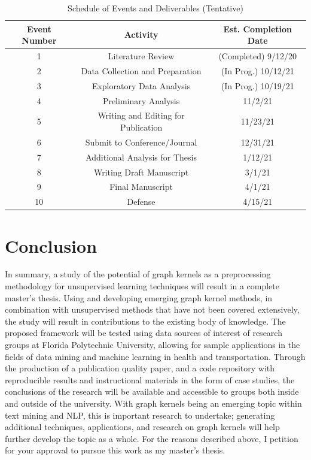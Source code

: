 \documentclass[11pt]{report}
\begin{document}
\begin{table}[ht]
\caption{Schedule of Events and Deliverables (Tentative)}
\label{tab:schedule}
\centering
\begin{tabular}{ c c c}
\hline
\hline
Event Number & Activity & Est. Completion Date \\ [0.5ex]
\hline
1 & Literature Review & (Completed) 9/12/20\\
2 & Data Collection and Preparation & (In Prog.)  10/12/21\\
3 & Exploratory Data Analysis & (In Prog.) 10/19/21\\
4 & Preliminary Analysis & 11/2/21\\
5 & Writing and Editing for Publication & 11/23/21\\
6 & Submit to Conference/Journal & 12/31/21\\
7 & Additional Analysis for Thesis & 1/12/21\\
8 & Writing Draft Manuscript & 3/1/21\\
9 & Final Manuscript & 4/1/21\\
10 & Defense & 4/15/21\\
\hline
\end{tabular}

\end{table}




\section{Conclusion}


In summary, a study of the potential of graph kernels as a preprocessing methodology for unsupervised learning techniques will result in a complete master's thesis. Using and developing emerging graph kernel methods, in combination with unsupervised methods that have not been covered extensively, the study will result in contributions to the existing body of knowledge. The proposed framework will be tested using data sources of interest of research groups at Florida Polytechnic University, allowing for sample applications in the fields of data mining and machine learning in health and transportation. Through the production of a publication quality paper, and a code repository with reproducible results and instructional materials in the form of case studies, the conclusions of the research will be available and accessible to groups both inside and outside of the university. With graph kernels being an emerging topic within text mining and NLP, this is important research to undertake; generating additional techniques, applications, and research on graph kernels will help further develop the topic as a whole.  
For the reasons described above, I petition for your approval to pursue this work as my master's thesis.





\nocite{silge2016tidytext}
\nocite{csardi2006igraph}
\nocite{wickham2019welcome}



%

\end{document}
